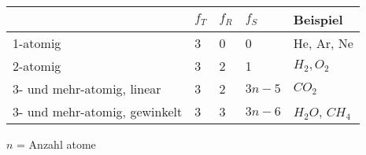 \noindent
\begin{tabularx}{\columnwidth}{@{}XXXXX@{}}
	\hline
	                              & $f_T$ & $f_R$ & $f_S$  & Beispiel       \\ \hline
	1-atomig                      & 3     & 0     & 0      & He, Ar, Ne     \\ \hline
	2-atomig                      & 3     & 2     & 1      & ${H_2}, {O_2}$ \\ \hline
	3- und mehr-atomig, linear    & 3     & 2     & $3n-5$ & $CO_2$         \\ \hline
	3- und mehr-atomig, gewinkelt & 3     & 3     & $3n-6$ & $H_2O$, $CH_4$ \\ \hline
\end{tabularx}
\linebreak
$n$ = Anzahl atome
\vspace{1mm}

